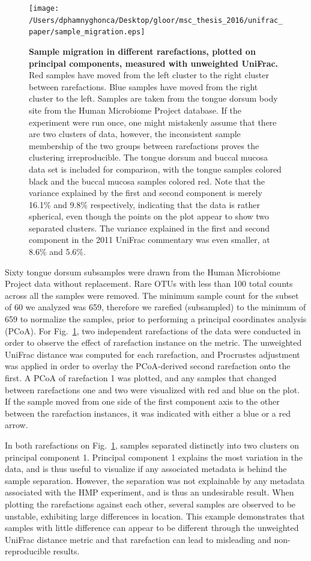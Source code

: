 \documentclass[10pt,letterpaper]{article}
\begin{document}
\begin{figure}[h]
\texttt{[image: /Users/dphamnyghonca/Desktop/gloor/msc\_thesis\_2016/unifrac\_paper/sample\_migration.eps]}
\caption{{\bf Sample migration in different rarefactions, plotted on principal components, measured with unweighted UniFrac.}
Red samples have moved from the left cluster to the right cluster between rarefactions. Blue samples have moved from the right cluster to the left. Samples are taken from the tongue dorsum body site from the Human Microbiome Project database. If the experiment were run once, one might mistakenly assume that there are two clusters of data, however, the inconsistent sample membership of the two groups between rarefactions proves the clustering irreproducible. The tongue dorsum and buccal mucosa data set is included for comparison, with the tongue samples colored black and the buccal mucosa samples colored red. Note that the variance explained by the first and second component is merely 16.1\% and 9.8\% respectively, indicating that the data is rather spherical, even though the points on the plot appear to show two separated clusters. The variance explained in the first and second component in the 2011 UniFrac commentary \cite{lozupone2011unifrac} was even smaller, at 8.6\% and 5.6\%.}
\label{fig2}
\end{figure}

Sixty tongue dorsum subsamples were drawn from the Human Microbiome Project data without replacement. Rare OTUs with less than 100 total counts across all the samples were removed. The minimum sample count for the subset of 60 we analyzed was 659, therefore we rarefied (subsampled) to the minimum of 659 to normalize the samples, prior to performing a principal coordinates analysis (PCoA). For Fig.~\ref{fig2}, two independent rarefactions of the data were conducted in order to observe the effect of rarefaction instance on the metric. The unweighted UniFrac distance was computed for each rarefaction, and Procrustes adjustment was applied in order to overlay the PCoA-derived second rarefaction onto the first. A PCoA of rarefaction 1 was plotted, and any samples that changed between rarefactions one and two were visualized with red and blue on the plot. If the sample moved from one side of the first component axis to the other between the rarefaction instances, it was indicated with either a blue or a red arrow. 

In both rarefactions on Fig.~\ref{fig2}, samples separated distinctly into two clusters on principal component 1. Principal component 1 explains the most variation in the data, and is thus useful to visualize if any associated metadata is behind the sample separation. However, the separation was not explainable by any metadata associated with the HMP experiment, and is thus an undesirable result. When plotting the rarefactions against each other, several samples are observed to be unstable, exhibiting large differences in location. This example demonstrates that samples with little difference can appear to be different through the unweighted UniFrac distance metric and that rarefaction can lead to misleading and non-reproducible results.
\end{document}
